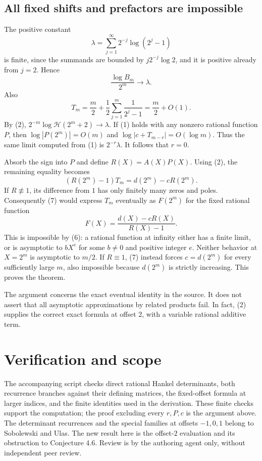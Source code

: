 \documentclass[11pt]{article}
\newcommand{\HH}{\mathcal H}
\begin{document}
\subsection*{All fixed shifts and prefactors are impossible}
The positive constant
\[
 \lambda=\sum_{j=1}^{\infty}2^{-j}\log(2^j-1)
\]
is finite, since the summands are bounded by $j2^{-j}\log2$,
and it is positive already from $j=2$. Hence
\[
 \frac{\log B_m}{2^m}\longrightarrow\lambda.
\]
Also
\[
 T_m=\frac m2+\frac12\sum_{j=1}^m\frac1{2^j-1}
     =\frac m2+O(1).                                         \tag{6}
\]
By (2), $2^{-m}\log\HH(2^m+2)\to\lambda$.
If (1) holds with any nonzero rational function $P$, then
$\log|P(2^m)|=O(m)$ and $\log|c+T_{m-r}|=O(\log m)$.
Thus the same limit computed from (1) is $2^{-r}\lambda$.
It follows that $r=0$.

Absorb the sign into $P$ and define $R(X)=A(X)P(X)$.
Using (2), the remaining equality becomes
\[
 (R(2^m)-1)T_m=d(2^m)-cR(2^m).                              \tag{7}
\]
If $R\not\equiv1$, its difference from $1$ has only finitely many
zeros and poles. Consequently (7) would express $T_m$ eventually as
$F(2^m)$ for the fixed rational function
\[
 F(X)=\frac{d(X)-cR(X)}{R(X)-1}.
\]
This is impossible by (6): a rational function at infinity either
has a finite limit, or is asymptotic to $bX^e$ for some $b\ne0$
and positive integer $e$. Neither behavior at $X=2^m$ is
asymptotic to $m/2$. If $R\equiv1$, (7) instead forces
$c=d(2^m)$ for every sufficiently large $m$, also impossible because
$d(2^m)$ is strictly increasing. This proves the theorem.

The argument concerns the exact eventual identity in the source.
It does not assert that all asymptotic approximations by related
products fail. In fact, (2) supplies the correct exact formula at
offset $2$, with a variable rational additive term.

\section*{Verification and scope}
The accompanying script checks direct rational Hankel determinants,
both recurrence branches against their defining matrices, the
fixed-offset formula at larger indices, and the finite identities
used in the derivation. These finite checks support the computation;
the proof excluding every $r,P,c$ is the argument above.
The determinant recurrences and the special families at offsets
$-1,0,1$ belong to Sobolewski and Ulas. The new result here is the
offset-$2$ evaluation and its obstruction to Conjecture 4.6.
Review is by the authoring agent only, without independent peer review.
\end{document}
